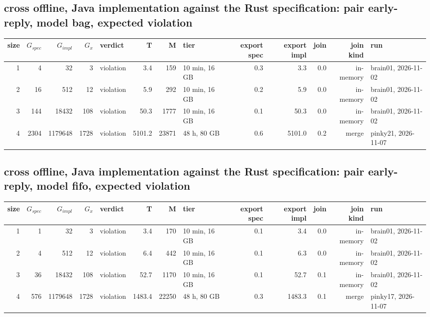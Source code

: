 \documentclass[10pt]{article}
\begin{document}
\subsection*{cross offline, Java implementation against the Rust specification: pair \textsf{early-reply}, model bag, expected violation}
\begin{longtable}{@{}rrrrlrrlrrrrl@{}}
\toprule
size & $G_{\mathit{spec}}$ & $G_{\mathit{impl}}$ & $G_x$ & verdict & T & M & tier & export spec & export impl & join & join kind & run \\
\midrule
\endhead
\color{red} 1 & 4 & 32 & 3 & violation & 3.4 & 159 & 10 min, 16 GB & 0.3 & 3.3 & 0.0 & in-memory & brain01, 2026-11-02 \\
\color{red} 2 & 16 & 512 & 12 & violation & 5.9 & 292 & 10 min, 16 GB & 0.2 & 5.9 & 0.0 & in-memory & brain01, 2026-11-02 \\
\color{red} 3 & 144 & 18432 & 108 & violation & 50.3 & 1777 & 10 min, 16 GB & 0.1 & 50.3 & 0.0 & in-memory & brain01, 2026-11-02 \\
\color{red} 4 & 2304 & 1179648 & 1728 & violation & 5101.2 & 23871 & 48 h, 80 GB & 0.6 & 5101.0 & 0.2 & merge & pinky21, 2026-11-07 \\
\bottomrule
\end{longtable}
\subsection*{cross offline, Java implementation against the Rust specification: pair \textsf{early-reply}, model fifo, expected violation}
\begin{longtable}{@{}rrrrlrrlrrrrl@{}}
\toprule
size & $G_{\mathit{spec}}$ & $G_{\mathit{impl}}$ & $G_x$ & verdict & T & M & tier & export spec & export impl & join & join kind & run \\
\midrule
\endhead
\color{red} 1 & 1 & 32 & 3 & violation & 3.4 & 170 & 10 min, 16 GB & 0.1 & 3.4 & 0.0 & in-memory & brain01, 2026-11-02 \\
\color{red} 2 & 4 & 512 & 12 & violation & 6.4 & 442 & 10 min, 16 GB & 0.1 & 6.3 & 0.0 & in-memory & brain01, 2026-11-02 \\
\color{red} 3 & 36 & 18432 & 108 & violation & 52.7 & 1170 & 10 min, 16 GB & 0.1 & 52.7 & 0.1 & in-memory & brain01, 2026-11-02 \\
\color{red} 4 & 576 & 1179648 & 1728 & violation & 1483.4 & 22250 & 48 h, 80 GB & 0.3 & 1483.3 & 0.1 & merge & pinky17, 2026-11-07 \\
\bottomrule
\end{longtable}
\end{document}
